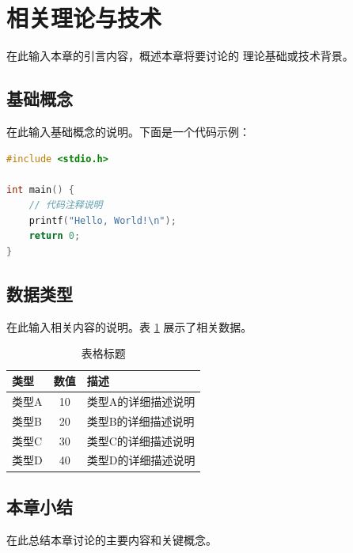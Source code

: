 
\section{相关理论与技术}

在此输入本章的引言内容，概述本章将要讨论的
理论基础或技术背景。

\subsection{基础概念}

在此输入基础概念的说明。下面是一个代码示例：

\begin{lstlisting}[language=C, caption={代码示例标题}, label={lst:example}]
#include <stdio.h>

int main() {
    // 代码注释说明
    printf("Hello, World!\n");
    return 0;
}
\end{lstlisting}

\subsection{数据类型}

在此输入相关内容的说明。表 \ref{tab:example_data} 
展示了相关数据。

\begin{table}[H]
    \centering
    \caption{表格标题}
    \label{tab:example_data}
    \begin{tabularx}{0.9\textwidth}{l c X}
        \toprule
        类型 & 数值 & 描述 \\
        \midrule
        类型A & 10 & 类型A的详细描述说明 \\
        类型B & 20 & 类型B的详细描述说明 \\
        类型C & 30 & 类型C的详细描述说明 \\
        类型D & 40 & 类型D的详细描述说明 \\
        \bottomrule
    \end{tabularx}
\end{table}

\subsection{本章小结}

在此总结本章讨论的主要内容和关键概念。
